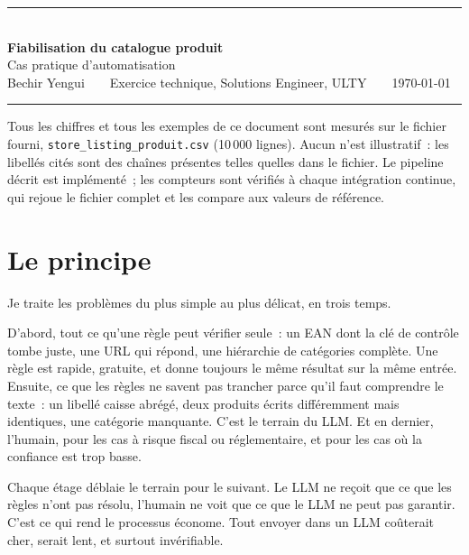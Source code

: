 \documentclass[11pt,a4paper]{article}
\begin{document}
\begin{center}
{\color{detln}\rule{0.18\linewidth}{2.2pt}}\\[10pt]
{\LARGE\bfseries\color{ink}Fiabilisation du catalogue produit}\\[5pt]
{\large\color{detln}Cas pratique d'automatisation}\\[10pt]
{\color{softgray}\small Bechir Yengui\ \ \textbullet\ \ Exercice technique, Solutions Engineer, ULTY\ \ \textbullet\ \ \today}\\[10pt]
{\color{detln!30}\rule{\linewidth}{0.8pt}}
\end{center}
\vspace{0.4em}

{\small\color{softgray}\begin{sloppypar}
Tous les chiffres et tous les exemples de ce document sont mesurés sur le fichier fourni,
\texttt{store\_listing\_produit.csv} (10\,000 lignes). Aucun n'est illustratif~: les
libellés cités sont des chaînes présentes telles quelles dans le fichier. Le pipeline
décrit est implémenté~; les compteurs sont vérifiés à chaque intégration continue, qui
rejoue le fichier complet et les compare aux valeurs de référence.
\end{sloppypar}}

\section*{Le principe}

Je traite les problèmes du plus simple au plus délicat, en trois temps.

D'abord, tout ce qu'une règle peut vérifier seule~: un EAN dont la clé de contrôle tombe juste,
une URL qui répond, une hiérarchie de catégories complète. Une règle est rapide, gratuite, et donne
toujours le même résultat sur la même entrée. Ensuite, ce que les règles ne savent pas trancher
parce qu'il faut comprendre le texte~: un libellé caisse abrégé, deux produits écrits différemment
mais identiques, une catégorie manquante. C'est le terrain du LLM. Et en dernier, l'humain, pour les
cas à risque fiscal ou réglementaire, et pour les cas où la confiance est trop basse.

Chaque étage déblaie le terrain pour le suivant. Le LLM ne reçoit que ce que les règles n'ont pas
résolu, l'humain ne voit que ce que le LLM ne peut pas garantir. C'est ce qui rend le processus
économe. Tout envoyer dans un LLM coûterait cher, serait lent, et surtout invérifiable.
\end{document}
